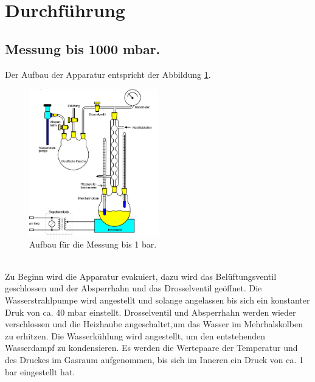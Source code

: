 \section{Durchführung}
\label{sec:Durchführung}
\subsection{Messung bis 1000 mbar.}
Der Aufbau der Apparatur entspricht der Abbildung \ref{fig:aufbau1}.
\begin{figure}
  \centering
  \includegraphics[width=0.5\textwidth]{aufbau1.PNG}
  \caption{Aufbau für die Messung bis 1 bar.}
  \label{fig:aufbau1}
\end{figure}\\
Zu Beginn wird die Apparatur evakuiert, dazu wird das
Belüftungsventil geschlossen und der Absperrhahn und das
Drosselventil geöffnet. Die Wasserstrahlpumpe wird angestellt
und solange angelassen bis sich ein konstanter Druk von ca. 40 mbar einstellt.
Drosselventil und Absperrhahn werden wieder verschlossen und die Heizhaube angeschaltet,um das Wasser im Mehrhalskolben zu erhitzen.
Die Wasserkühlung wird angestellt, um den entstehenden Wasserdampf zu kondensieren.
Es werden die Wertepaare der Temperatur und des Druckes im Gasraum aufgenommen,
bis sich im Inneren ein Druck von ca. 1 bar eingestellt hat.
